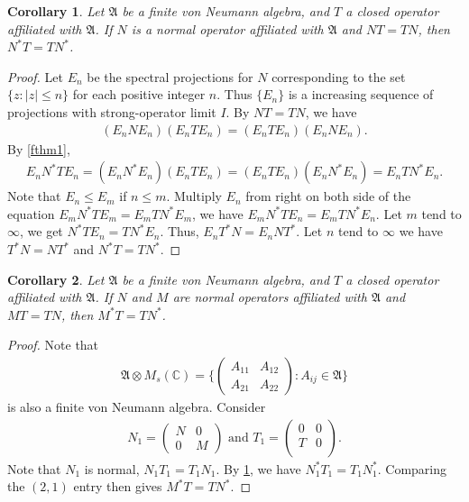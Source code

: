 \documentclass[a4paper,10pt]{amsart}
\newtheorem{corollary}{Corollary}[section]
\newcommand{\AAA}{\mathfrak A}
\newcommand{\C}{\mathbb C} %
\begin{document}
\begin{corollary}\label{fcor2}
    Let $\AAA$ be a finite von Neumann algebra,
    and $T$ a closed operator affiliated with $\AAA$. 
    If $N$ is a normal operator affiliated with $\AAA$ and $NT = TN$, then
    $N^{*}T = TN^{*}$.
\end{corollary}

\begin{proof}
   Let $E_n$ be the spectral projections for $N$ corresponding to the set 
   $\{ z : |z| \leq n \}$ for each positive integer $n$. 
   Thus $\{ E_{n} \}$ is a increasing
   sequence of projections with strong-operator limit $I$. By $NT = TN$, we have
   \begin{align*}
      (E_{n}NE_{n})(E_nTE_{n}) = (E_{n}TE_{n})(E_{n}NE_{n}).
   \end{align*}  
   By \cref{fthm1},
   \begin{align*}
       E_{n}N^{*}TE_{n} = (E_{n}N^{*}E_{n})(E_nTE_{n}) 
       = (E_{n}TE_{n})(E_{n}N^{*}E_{n})=E_{n}TN^{*}E_{n}.
   \end{align*} 
   Note that $E_{n} \leq E_{m}$ if $n \leq m$. 
   Multiply $E_n$ from right on both side of the equation 
   $E_{m}N^{*}TE_{m} = E_{m}TN^{*}E_{m}$, we have
   $E_{m}N^{*}TE_{n} = E_{m}TN^{*}E_{n}$.
   Let $m$ tend to $\infty$,  we get $N^{*}TE_{n} = TN^{*}E_{n}$. 
   Thus, $E_{n}T^{*}N = E_{n}NT^{*}$. Let $n$ tend to $\infty$ we have
   $T^{*}N = NT^{*}$ and $N^{*}T = TN^{*}$. 
\end{proof}

\begin{corollary}\label{fcor3}
    Let $\AAA$ be a finite von Neumann algebra,
    and $T$ a closed operator affiliated with $\AAA$. 
    If $N$ and $M$ are normal operators affiliated with $\AAA$ and $MT = TN$, then
    $M^{*}T = TN^{*}$.
\end{corollary}

\begin{proof}
    Note that
    \begin{align*}
      \AAA \otimes M_{s}(\C) = \{
        \begin{pmatrix}
         A_{11} & A_{12} \\
         A_{21} & A_{22}
    \end{pmatrix} : A_{ij} \in \AAA \}  
    \end{align*}
    is also a finite von Neumann algebra. 
    Consider
    \begin{align*}
        N_{1} = \begin{pmatrix}
            N & 0\\
            0 & M
        \end{pmatrix}
        \mbox{ and } 
        T_{1} = \begin{pmatrix}
            0 & 0\\
            T & 0\\
        \end{pmatrix}.
    \end{align*}
    Note that $N_1$ is normal, $N_{1}T_{1} = T_{1}N_{1}$. 
    By \cref{fcor2}, we have
    $N_{1}^{*}T_{1} = T_{1}N_{1}^{*}$. Comparing the $(2,1)$ entry then
    gives $M^{*}T = TN^{*}$.
\end{proof}
\end{document}
